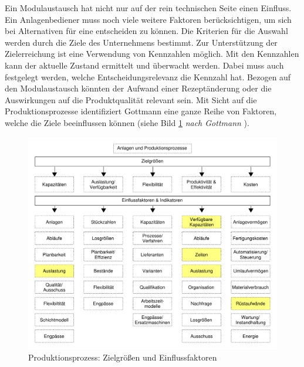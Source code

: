 Ein Modulaustausch hat nicht nur auf der rein technischen Seite einen Einfluss. Ein Anlagenbediener muss noch viele weitere Faktoren berücksichtigen, um sich bei Alternativen für eine entscheiden zu können. Die Kriterien für die Auswahl werden durch die Ziele des Unternehmens bestimmt. Zur Unterstützung der Zielerreichung ist eine Verwendung von Kennzahlen möglich. Mit den Kennzahlen kann der aktuelle Zustand ermittelt und überwacht werden. Dabei muss auch festgelegt werden, welche Entscheidungsrelevanz die Kennzahl hat.  Bezogen auf den Modulaustausch könnten der Aufwand einer Rezeptänderung oder die Auswirkungen auf die Produktqualität relevant sein. Mit Sicht auf die Produktionsprozesse identifiziert Gottmann \cite{Gottmann2016} eine ganze Reihe von Faktoren, welche die Ziele beeinflussen können (siehe Bild \ref{pic:Produktionsprozesse-Zielgroessen}  \textit{nach Gottmann} \citep[50]{Gottmann2016}).
\begin{figure}[htb]
\centering
\includegraphics[scale=0.5]{DA_files/Bilder/Analyse/Produktionsprozesse-Zielgroessen.pdf}
\caption{Produktionsprozess: Zielgrößen und Einflussfaktoren \citep[50]{Gottmann2016}}
\label{pic:Produktionsprozesse-Zielgroessen}
\end{figure}

